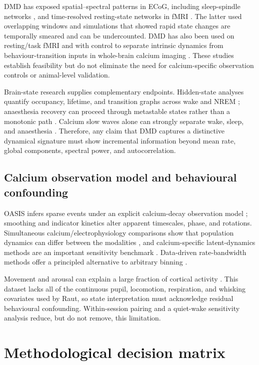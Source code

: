 \documentclass[11pt,a4paper]{article}
\begin{document}
DMD has exposed spatial--spectral patterns in ECoG, including sleep-spindle networks \citep{brunton2016neural}, and time-resolved resting-state networks in fMRI \citep{kunertgraf2019}. The latter used overlapping windows and simulations that showed rapid state changes are temporally smeared and can be undercounted. DMD has also been used on resting/task fMRI \citep{casorso2019} and with control to separate intrinsic dynamics from behaviour-transition inputs in whole-brain calcium imaging \citep{fieseler2020}. These studies establish feasibility but do not eliminate the need for calcium-specific observation controls or animal-level validation.

Brain-state research supplies complementary endpoints. Hidden-state analyses quantify occupancy, lifetime, and transition graphs across wake and NREM \citep{stevner2019}; anaesthesia recovery can proceed through metastable states rather than a monotonic path \citep{hudson2014}. Calcium slow waves alone can strongly separate wake, sleep, and anaesthesia \citep{brier2019,tortcolet2023}. Therefore, any claim that DMD captures a distinctive dynamical signature must show incremental information beyond mean rate, global components, spectral power, and autocorrelation.

\subsection{Calcium observation model and behavioural confounding}

OASIS infers sparse events under an explicit calcium-decay observation model \citep{friedrich2017}; smoothing and indicator kinetics alter apparent timescales, phase, and rotations. Simultaneous calcium/electrophysiology comparisons show that population dynamics can differ between the modalities \citep{wei2020}, and calcium-specific latent-dynamics methods are an important sensitivity benchmark \citep{koh2023}. Data-driven rate-bandwidth methods offer a principled alternative to arbitrary binning \citep{shimazaki2010}.

Movement and arousal can explain a large fraction of cortical activity \citep{stringer2019,musall2019}. This dataset lacks all of the continuous pupil, locomotion, respiration, and whisking covariates used by Raut, so state interpretation must acknowledge residual behavioural confounding. Within-session pairing and a quiet-wake sensitivity analysis reduce, but do not remove, this limitation.

\section{Methodological decision matrix}
\end{document}
